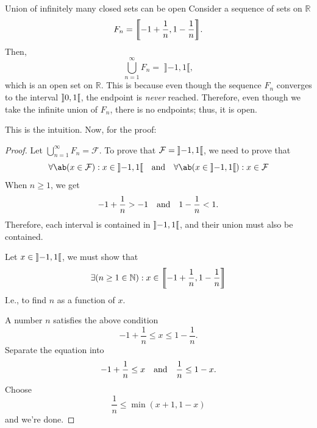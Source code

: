 \begin{exmp}{Union of infinitely many closed sets can be open}{}
  Consider a sequence of sets on \(\mathbb{R}\)
  \begin{equation}
    F_n = \cintv{- 1 + \frac{1}{n}, 1 - \frac{1}{n}}.
  \end{equation}
  Then,
  \begin{equation}
    \bigcup_{n=1}^{\infty}F_n = \;\rBrack \mbox{\(-1\)}, 1\lBrack,
  \end{equation}
  which is an open set on \(\mathbb{R}\). This is because even though the sequence \(F_n\)
  converges to the interval \(\ointv{0, 1}\), the endpoint is \emph{never} reached. Therefore,
  even though we take the infinite union of \(F_n\), there is no endpoints; thus, it is open.

  This is the intuition. Now, for the proof:

  \begin{proof}
    Let \(\bigcup_{n=1}^{\infty} F_n = \mathcal{F}\). To prove that \(\mathcal{F} = \ointv{-1, 1}\),
    we need to prove that
    \begin{equation}
      \forall \ab(x \in \mathcal{F}) : x \in \ointv{-1, 1} \mathand \forall \ab(x \in \ointv{-1, 1}) : x
                                         \in \mathcal{F}
    \end{equation}
    \forwarddir When \(n \geq 1\), we get
    \begin{gather}
      -1 + \frac{1}{n} > -1 \quad\textrm{and}\quad 1 - \frac{1}{n} < 1.
    \end{gather}
    Therefore, each interval is contained in \(\ointv{-1, 1}\), and their union must
    also be contained.

    \backwarddir Let \(x \in \ointv{-1, 1}\), we must show that
    \begin{equation}
      \exists (n \geq 1 \in \mathbb{N}) : x \in \cintv{-1 + \frac{1}{n}, 1 - \frac{1}{n}}
    \end{equation}
    I.e., to find \(n\) as a function of \(x\).

    A number \(n\) satisfies the above condition \ifft
    \begin{equation}
      -1 + \frac{1}{n} \leq x \leq 1 - \frac{1}{n}.
    \end{equation}
    Separate the equation into
    \begin{equation}
      -1 + \frac{1}{n} \leq x \quad\textrm{and}\quad \frac{1}{n} \leq 1 - x.
    \end{equation}
    Choose
    \begin{equation}
      \frac{1}{n} \leq \min(x + 1, 1 - x)
    \end{equation}
    and we're done.
  \end{proof}
\end{exmp}

